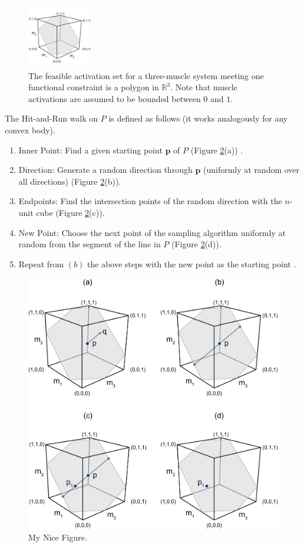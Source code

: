 \begin{figure}[ht]
  \label{fig:fig_hr}
   \begin{center}
    \includegraphics[width=0.25\textwidth]{sections/figs/feasibleactivation.png}
  \end{center}
  \caption{The feasible activation set for a  three-muscle system meeting one functional constraint is a polygon in $\mathbb{R}^3$. Note that muscle activations are assumed to be bounded between $0$ and $1$.}

\end{figure}

The Hit-and-Run walk on $P$ is defined as follows (it works analogously for any convex body). 
\begin{enumerate}
\item Inner Point: Find a given starting point $\textbf{p}$ of $P$ (Figure \ref{fig:hitruncube}(a)) .
\item Direction: Generate a random direction through $\textbf{p}$ (uniformly at random over all directions) (Figure \ref{fig:hitruncube}(b)).
\item Endpoints: Find the intersection points of the random direction with the $n$-unit cube (Figure \ref{fig:hitruncube}(c)).
\item New Point: Choose the next point of the sampling algorithm uniformly at random from the segment of the line in $P$ (Figure \ref{fig:hitruncube}(d)). 
\item Repeat from $(b)$ the above steps with the new point as the starting point .
\end{enumerate}


\begin{figure}[htbp]
\centering
\includegraphics[width=7.5cm\textwidth]{sections/figs/hitruncube.png}
\caption{My Nice Figure.}
\label{fig:hitruncube}
\end{figure}


